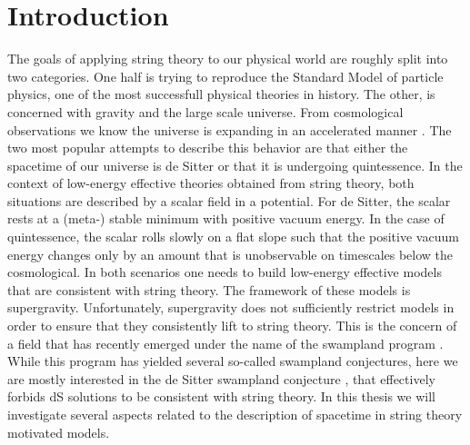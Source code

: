 \documentclass[a4paper,12pt]{report}
\begin{document}
\chapter{Introduction}
The goals of applying string theory to our physical world are roughly split into two categories. One half is trying to reproduce the Standard Model of particle physics, one of the most successfull physical theories in history. The other, is concerned with gravity and the large scale universe. From cosmological observations we know the universe is expanding in an accelerated manner \cite{Planck:2018jri}. The two most popular attempts to describe this behavior are that either the spacetime of our universe is de Sitter or that it is undergoing quintessence. In the context of low-energy effective theories obtained from string theory, both situations are described by a scalar field in a potential. For de Sitter, the scalar rests at a (meta-) stable minimum with positive vacuum energy. In the case of quintessence, the scalar rolls slowly on a flat slope such that the positive vacuum energy changes only by an amount that is unobservable on timescales below the cosmological. In both scenarios one needs to build low-energy effective models that are consistent with string theory. The framework of these models is supergravity. Unfortunately, supergravity does not sufficiently restrict models in order to ensure that they consistently lift to string theory. This is the concern of a field that has recently emerged under the name of the swampland program \cite{Brennan:2017rbf,Palti:2019pca,vanBeest:2021lhn}. While this program has yielded several so-called swampland conjectures, here we are mostly interested in the de Sitter swampland conjecture \cite{Obied:2018sgi}, that effectively forbids dS solutions to be consistent with string theory. In this thesis we will investigate several aspects related to the description of spacetime in string theory motivated models.\\
\end{document}
